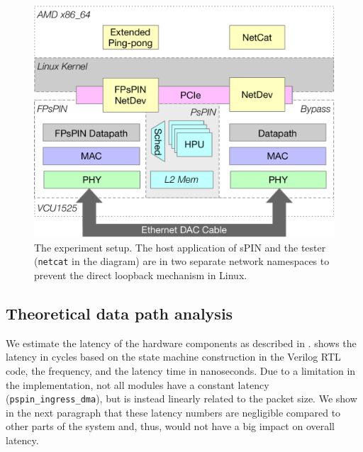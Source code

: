 \begin{figure}
    \centering
    \includegraphics[width=.9\linewidth]{figures/experiment-setup.pdf}
    \caption{The experiment setup.  The host application of sPIN and the tester (\texttt{netcat} in the diagram) are in two separate network namespaces to prevent the direct loopback mechanism in Linux.}
    \label{fig:experiment-setup}
\end{figure}

\subsection{Theoretical data path analysis} \label{sec:hw-latency-analysis}

We estimate the latency of the hardware components as described in .   shows the latency in cycles based on the state machine construction in the Verilog RTL code, the frequency, and the latency time in nanoseconds.  Due to a limitation in the implementation, not all modules have a constant latency (\texttt{pspin\_ingress\_dma}), but is instead linearly related to the packet size.  We show in the next paragraph that these latency numbers are negligible compared to other parts of the system and, thus, would not have a big impact on overall latency.


